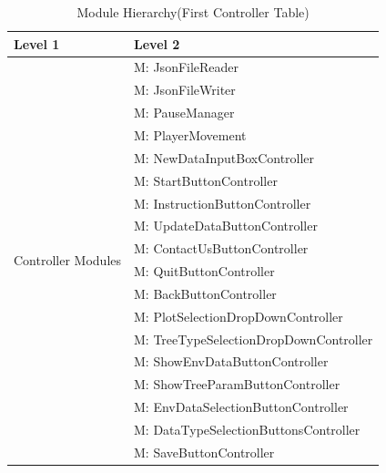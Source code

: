 \documentclass[12pt, titlepage]{article}
\newcounter{mnum}
\newcommand{\mthemnum}{M\themnum}
\begin{document}
\begin{table}[H]
\caption{Module Hierarchy(First Controller Table)}
\label{TblControllers}

\centering
\begin{tabular}{p{} p{}}
\toprule
\textbf{Level 1} & \textbf{Level 2}\\
\midrule

\multirow{18}{0.3\textwidth}{Controller Modules}
& {mnum} \mthemnum \label{Controller1}: JsonFileReader \\
& {mnum} \mthemnum \label{Controller2}: JsonFileWriter  \\
& {mnum} \mthemnum \label{Controller3}: PauseManager  \\
& {mnum} \mthemnum \label{Controller4}: PlayerMovement  \\
& {mnum} \mthemnum \label{Controller5}: NewDataInputBoxController\\
& {mnum} \mthemnum \label{Controller6}: StartButtonController  \\
& {mnum} \mthemnum \label{Controller7}: InstructionButtonController \\
& {mnum} \mthemnum \label{Controller8}: UpdateDataButtonController\\
& {mnum} \mthemnum \label{Controller9}: ContactUsButtonController \\
& {mnum} \mthemnum \label{Controller10}: QuitButtonController  \\
& {mnum} \mthemnum \label{Controller11}: BackButtonController \\
& {mnum} \mthemnum \label{Controller12}: PlotSelectionDropDownController \\
& {mnum} \mthemnum \label{Controller13}: TreeTypeSelectionDropDownController \\
& {mnum} \mthemnum \label{Controller14}: ShowEnvDataButtonController \\
& {mnum} \mthemnum \label{Controller15}: ShowTreeParamButtonController \\
& {mnum} \mthemnum \label{Controller16}: EnvDataSelectionButtonController\\
& {mnum} \mthemnum \label{Controller17}: DataTypeSelectionButtonsController \\
& {mnum} \mthemnum \label{Controller18}: SaveButtonController \\
\bottomrule

\end{tabular}

\end{table}
\end{document}
